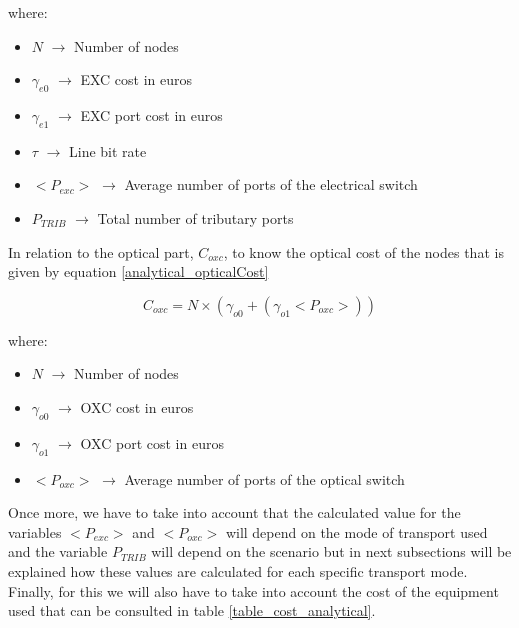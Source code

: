 \vspace{11pt}
\noindent
where:
\begin{itemize}
\item{$N$			$\rightarrow$	Number of nodes}
\item{$\gamma_{e0}$	$\rightarrow$	EXC cost in euros}
\item{$\gamma_{e1}$	$\rightarrow$	EXC port cost in euros}
\item{$\tau$		$\rightarrow$	Line bit rate}
\item{$<P_{exc}>$   $\rightarrow$   Average number of ports of the electrical switch}
\item{$P_{TRIB}$    $\rightarrow$   Total number of tributary ports}
\end{itemize}

\vspace{11pt}
In relation to the optical part, $C_{oxc}$, to know the optical cost of the nodes that is given by equation \ref{analytical_opticalCost}

\begin{equation}
C_{oxc} = N \times \left( \gamma_{o0} + \left( \gamma_{o1} <P_{oxc}> \right) \right)
\label{analytical_opticalCost}
\end{equation}

\vspace{11pt}
\noindent
where:
\begin{itemize}
\item{$N$			$\rightarrow$	Number of nodes}
\item{$\gamma_{o0}$	$\rightarrow$	OXC cost in euros}
\item{$\gamma_{o1}$	$\rightarrow$	OXC port cost in euros}
\item{$<P_{oxc}>$   $\rightarrow$   Average number of ports of the optical switch}
\end{itemize}

\vspace{11pt}
Once more, we have to take into account that the calculated value for the variables $<P_{exc}>$ and $<P_{oxc}>$ will depend on the mode of transport used and the variable $P_{TRIB}$ will depend on the scenario but in next subsections will be explained how these values are calculated for each specific transport mode.
Finally, for this we will also have to take into account the cost of the equipment used that can be consulted in table \ref{table_cost_analytical}.\\

